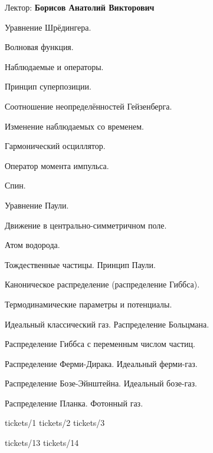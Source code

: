 \documentclass[specialist, subf, href, colorlinks=true, 12pt, times, mtpro, final]{disser}
\begin{document}
\tableofcontents

\newpage
{}
\noindent Лектор: {\bf Борисов Анатолий Викторович}\\

\begin{enumerate}
{\footnotesize
\item Уравнение Шрёдингера.
\item Волновая функция.
\item Наблюдаемые и операторы.
\item Принцип суперпозиции.
\item Соотношение неопределённостей Гейзенберга.
\item Изменение наблюдаемых со временем.
\item Гармонический осциллятор.
\item Оператор момента импульса.
\item Спин.
\item Уравнение Паули.
\item Движение в центрально-симметричном поле.
\item Атом водорода.
\item Тождественные частицы. Принцип Паули.
\item Каноническое распределение (распределение Гиббса).
\item Термодинамические параметры и потенциалы.
\item Идеальный классический газ. Распределение Больцмана. 
\item Распределение Гиббса с переменным числом частиц. 
\item Распределение Ферми-Дирака. Идеальный ферми-газ.
\item Распределение Бозе-Эйнштейна. Идеальный бозе-газ.
\item Распределение Планка. Фотонный газ.
}
\end{enumerate}

 {tickets/1}
 {tickets/2}
 {tickets/3}

 {tickets/13}
 {tickets/14}
\end{document}
